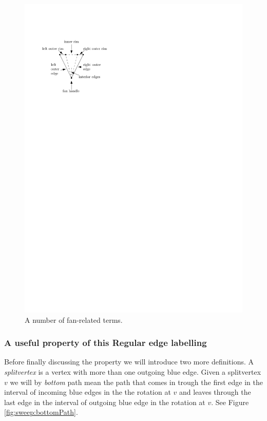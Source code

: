      \begin{figure}[h]
       \centering
       \includegraphics[scale=1]{rectangularDuals/img/fanterms}
       \caption{A number of fan-related terms.}
       \label{fig:rect:fanTerms}
     \end{figure}

\subsubsection{A useful property of this Regular edge labelling}
  Before finally discussing the property we will introduce two more definitions.
  A \emph{splitvertex} is a vertex with more than one outgoing blue edge.
  Given a splitvertex $v$ we will by \emph{bottom} path mean the path that comes in trough the first edge in the interval of incoming blue edges in the the rotation at $v$ and leaves through the last edge in the interval of outgoing blue edge in the rotation at $v$.
  See Figure \ref{fig:sweep:bottomPath}.

